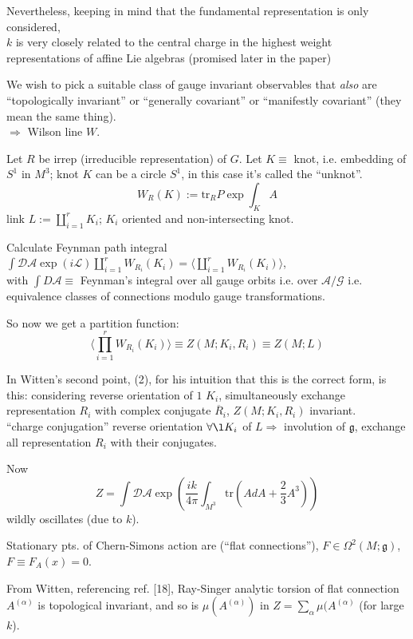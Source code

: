 \documentclass[10pt]{amsart}
\begin{document}
Nevertheless, keeping in mind that the fundamental representation is only considered, \\
$k$ is very closely related to the central charge in the highest weight representations of affine Lie algebras (promised later in the paper)

We wish to pick a suitable class of gauge invariant observables that \emph{also} are ``topologically invariant'' or ``generally covariant'' or ``manifestly covariant'' (they mean the same thing).  \\
$\Longrightarrow $ Wilson line $W$.  

Let $R$ be irrep (irreducible representation) of $G$.  Let $K \equiv $ knot, i.e. embedding of $S^1$ in $M^3$; knot $K$ can be a circle $S^1$, in this case it's called the ``unknot''.
\[
W_R(K) := \text{tr}_R P\exp{ \int_K A}
\]
link $L := \coprod_{i=1}^r K_i $; $K_i$ oriented and non-intersecting knot.

Calculate Feynman path integral $\int \mathcal{D}\mathcal{A} \exp{ (i\mathcal{L})} \coprod_{i=1}^r W_{R_i}(K_i) = \langle \coprod_{i=1}^r W_{R_i}(K_i) \rangle$, \\
  with $\int D\mathcal{A} \equiv $ Feynman's integral over all gauge orbits i.e. over $\mathcal{A}/\mathcal{G}$ i.e. equivalence classes of connections modulo gauge transformations.

So now we get a partition function:
  \[
\langle \prod_{i=1}^r W_{R_i}(K_i) \rangle \equiv Z(M; K_i , R_i) \equiv Z(M;L)
\]

In Witten's second point, (2), for his intuition that this is the correct form, is this: considering reverse orientation of $1$ $K_i$, simultaneously exchange representation $R_i$ with complex conjugate $\overline{R}_i$, $Z(M;K_i,R_i)$ invariant.  \\
``charge conjugation'' reverse orientation $\forall \l K_i $ of $L \Longrightarrow $ involution of $\mathfrak{g}$, exchange all representation $R_i$ with their conjugates.

Now
\[
Z = \int \mathcal{D}\mathcal{A} \exp{ \left( \frac{ik}{4\pi } \int_{M^3} \text{tr}(AdA + \frac{2}{3} A^3) \right) }
\]
wildly oscillates (due to $k$).

Stationary pts. of Chern-Simons action are (``flat connections''), $F\in \Omega^2(M;\mathfrak{g})$, $F\equiv F_A(x) = 0$.

From Witten, referencing ref. [18], Ray-Singer analytic torsion of flat connection $A^{(\alpha)}$ is topological invariant, and so is $\mu(A^{(\alpha)})$ in $Z=\sum_{\alpha} \mu(A^{(\alpha)}$ (for large $k$).
\end{document}
